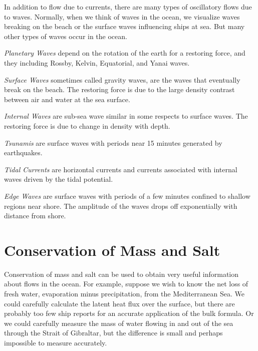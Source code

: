 In addition to flow due to currents, there are many types of
oscillatory flows due to waves. Normally, when we think of waves in
the ocean, we visualize waves breaking on the beach or the surface
waves influencing ships at sea. But many other types of waves occur in
the ocean.
\begin{enumerate}
\vitem\textit{Planetary Waves} depend on the rotation of the earth for a restoring
force, and they including Rossby,
Kelvin, Equatorial, and
Yanai waves.

\vitem\textit{Surface Waves} sometimes called gravity waves, are the waves that
eventually break on the beach. The restoring force is due to the large
density contrast between air and water at the sea surface.

\vitem\textit{Internal Waves} are
sub-sea wave similar in some respects to surface waves. The restoring
force is due to change in density with depth.

\vitem\textit{Tsunamis}
are surface waves
with periods near 15 minutes generated by earthquakes.

\vitem\textit{Tidal Currents} are horizontal
currents and currents associated with internal waves driven by the
tidal potential.

\vitem\textit{Edge Waves} are surface
waves with periods of a few minutes confined to shallow regions near
shore. The amplitude of the waves drops off exponentially with
distance from shore.
\end{enumerate}

\section{Conservation of Mass and Salt}
Conservation of mass and salt can be used
to obtain very useful information about flows in the ocean.  For
example, suppose we wish to know the net loss of fresh water,
evaporation minus precipitation, from the Mediterranean Sea. We could
carefully calculate the latent heat flux over the surface, but there
are probably too few ship reports for an accurate application of the
bulk formula. Or we could carefully measure the mass of water flowing
in and out of the sea through the Strait of Gibraltar, but the
difference is small and perhaps impossible to measure accurately.

